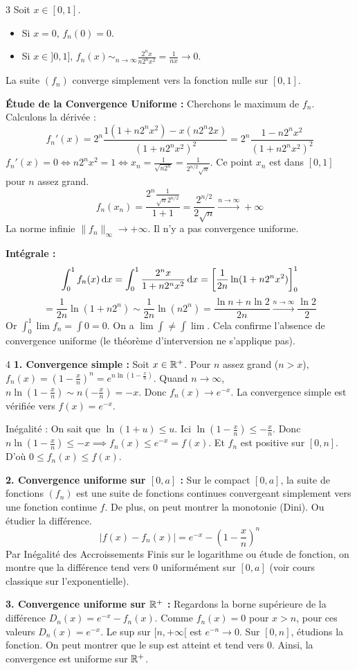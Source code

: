 \documentclass{prepacours}
\begin{document}
\begin{correction}{3}
Soit $x \in [0, 1]$.
\begin{itemize}
    \item Si $x = 0$, $f_n(0) = 0$.
    \item Si $x \in ]0, 1]$, $f_n(x) \sim_{n\to\infty} \frac{2^n x}{n 2^n x^2} = \frac{1}{nx} \to 0$.
\end{itemize}
La suite $(f_n)$ converge simplement vers la fonction nulle sur $[0, 1]$.

\textbf{Étude de la Convergence Uniforme :}
Cherchons le maximum de $f_n$. Calculons la dérivée :
$$ f_n'(x) = 2^n \frac{1(1+n 2^n x^2) - x(n 2^n 2x)}{(1+n 2^n x^2)^2} = 2^n \frac{1 - n 2^n x^2}{(1+n 2^n x^2)^2} $$
$f_n'(x) = 0 \iff n 2^n x^2 = 1 \iff x_n = \frac{1}{\sqrt{n 2^n}} = \frac{1}{2^{n/2}\sqrt{n}}$.
Ce point $x_n$ est dans $[0, 1]$ pour $n$ assez grand.
$$ f_n(x_n) = \frac{2^n \frac{1}{\sqrt{n} 2^{n/2}}}{1+1} = \frac{2^{n/2}}{2\sqrt{n}} \xrightarrow{n\to\infty} +\infty $$
La norme infinie $\|f_n\|_\infty \to +\infty$. Il n'y a pas convergence uniforme.

\textbf{Intégrale :}
$$ \int_0^1 f_n(x) \,\mathrm{d}x = \int_0^1 \frac{2^n x}{1+n 2^n x^2} \,\mathrm{d}x = \left[ \frac{1}{2n} \ln(1+n 2^n x^2) \right]_0^1 $$
$$ = \frac{1}{2n} \ln(1+n 2^n) \sim \frac{1}{2n} \ln(n 2^n) = \frac{\ln n + n \ln 2}{2n} \xrightarrow{n\to\infty} \frac{\ln 2}{2} $$
Or $\int_0^1 \lim f_n = \int 0 = 0$.
On a $\lim \int \neq \int \lim$. Cela confirme l'absence de convergence uniforme (le théorème d'interversion ne s'applique pas).
\end{correction}

\begin{correction}{4}
\textbf{1. Convergence simple :}
Soit $x \in \mathbb{R}^+$. Pour $n$ assez grand ($n>x$), $f_n(x) = (1-\frac{x}{n})^n = e^{n \ln(1-\frac{x}{n})}$.
Quand $n \to \infty$, $n \ln(1-\frac{x}{n}) \sim n(-\frac{x}{n}) = -x$.
Donc $f_n(x) \to e^{-x}$. La convergence simple est vérifiée vers $f(x) = e^{-x}$.

Inégalité : On sait que $\ln(1+u) \le u$. Ici $\ln(1-\frac{x}{n}) \le -\frac{x}{n}$.
Donc $n \ln(1-\frac{x}{n}) \le -x \implies f_n(x) \le e^{-x} = f(x)$.
Et $f_n$ est positive sur $[0, n]$. D'où $0 \le f_n(x) \le f(x)$.

\textbf{2. Convergence uniforme sur $[0, a]$ :}
Sur le compact $[0, a]$, la suite de fonctions $(f_n)$ est une suite de fonctions continues convergeant simplement vers une fonction continue $f$.
De plus, on peut montrer la monotonie (Dini). Ou étudier la différence.
$$ |f(x) - f_n(x)| = e^{-x} - (1-\frac{x}{n})^n $$
Par Inégalité des Accroissements Finis sur le logarithme ou étude de fonction, on montre que la différence tend vers 0 uniformément sur $[0, a]$ (voir cours classique sur l'exponentielle).

\textbf{3. Convergence uniforme sur $\mathbb{R}^+$ :}
Regardons la borne supérieure de la différence $D_n(x) = e^{-x} - f_n(x)$.
Comme $f_n(x) = 0$ pour $x > n$, pour ces valeurs $D_n(x) = e^{-x}$.
Le sup sur $[n, +\infty[$ est $e^{-n} \to 0$.
Sur $[0, n]$, étudions la fonction. On peut montrer que le sup est atteint et tend vers 0.
Ainsi, la convergence est uniforme sur $\mathbb{R}^+$.
\end{correction}
\end{document}

